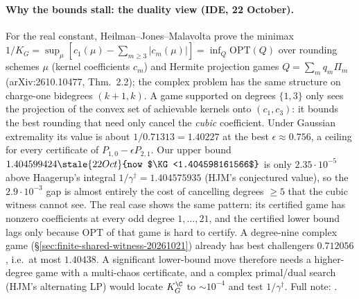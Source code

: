 \paragraph{Why the bounds stall: the duality view (IDE, 22 October).}
For the real constant, Heilman--Jones--Malavolta prove the minimax
$1/K_G=\sup_\mu[c_1(\mu)-\sum_{m\ge3}|c_m(\mu)|]=\inf_Q\mathrm{OPT}(Q)$ over
rounding schemes $\mu$ (kernel coefficients $c_m$) and Hermite projection
games $Q=\sum_mq_m\Pi_m$ (arXiv:2610.10477, Thm.~2.2); the complex problem
has the same structure on charge-one bidegrees $(k+1,k)$. A game supported
on degrees $\{1,3\}$ only sees the projection of the convex set of
achievable kernels onto $(c_1,c_3)$: it bounds the best rounding that need
only cancel the \emph{cubic} coefficient. Under Gaussian extremality its
value is about $1/0.71313=1.40227$ at the best $\epsilon\approx0.756$, a ceiling
for every certificate of $P_{1,0}-\epsilon P_{2,1}$. Our upper bound
$1.404599424\stale{22 Oct}{now $\KG<1.404598161566$}$ is only $2.35\cdot10^{-5}$ above Haagerup's integral
$1/\gamma^\dagger=1.404575935$ (HJM's conjectured value), so the
$2.9\cdot10^{-3}$ gap is almost entirely the cost of cancelling degrees
$\ge5$ that the cubic witness cannot see. The real case shows the same
pattern: its certified game has nonzero coefficients at every odd degree
$1,\dots,21$, and the certified lower bound lags only because
$\mathrm{OPT}$ of that game is hard to certify. A degree-nine complex game
(\S\ref{sec:finite-shared-witness-20261021}) already has best challengers
$0.712056$, i.e.\ at most $1.40438$. A significant lower-bound move
therefore needs a higher-degree game with a multi-chaos certificate, and a
complex primal/dual search (HJM's alternating LP) would locate $K_G^{\C}$ to
$\sim10^{-4}$ and test $1/\gamma^\dagger$. Full note:
.
